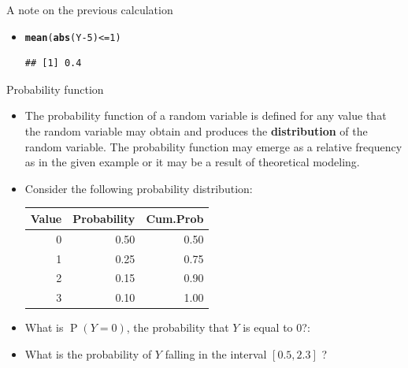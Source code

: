 \documentclass[10pt]{beamer}\usepackage[]{graphicx}\usepackage[]{color}
\makeatletter
\newcommand{\hlnum}[1]{\textcolor[rgb]{0.686,0.059,0.569}{#1}}%
\newcommand{\hlopt}[1]{\textcolor[rgb]{0,0,0}{#1}}%
\newcommand{\hlstd}[1]{\textcolor[rgb]{0.345,0.345,0.345}{#1}}%
\newcommand{\hlkwd}[1]{\textcolor[rgb]{0.737,0.353,0.396}{\textbf{#1}}}%
\newenvironment{kframe}{%
 \def\at@end@of@kframe{}%
 \ifinner\ifhmode%
  \def\at@end@of@kframe{\end{minipage}}%
  \begin{minipage}{\columnwidth}%
 \fi\fi%
 \def\FrameCommand##1{\hskip\@totalleftmargin \hskip-\fboxsep
 \colorbox{shadecolor}{##1}\hskip-\fboxsep
     \hskip-\linewidth \hskip-\@totalleftmargin \hskip\columnwidth}%
 \MakeFramed {\advance\hsize-\width
   \@totalleftmargin\z@ \linewidth\hsize
   \@setminipage}}%
 {\par\unskip\endMakeFramed%
 \at@end@of@kframe}
\newenvironment{knitrout}{}{} %
\newcommand{\Prob}{\operatorname{P}}
\makeatother
\begin{document}
\begin{frame}[fragile]{A note on the previous calculation}
\begin{itemize}[<+->]
\item 		
\begin{knitrout}
\color{fgcolor}\begin{kframe}
\begin{alltt}
\hlkwd{mean}\hlstd{(}\hlkwd{abs}\hlstd{(Y} \hlopt{-} \hlnum{5}\hlstd{)} \hlopt{<=} \hlnum{1}\hlstd{)}
\end{alltt}
\begin{verbatim}
## [1] 0.4
\end{verbatim}
\end{kframe}
\end{knitrout}
		
	\end{itemize}
	
\end{frame}




\begin{frame}[fragile]{Probability function}
	\small
	\begin{itemize}[<+->]
		
		\item The probability function of a random variable is defined for any value
		that the random variable may obtain and produces the \textbf{distribution} of
		the random variable. The probability function may emerge as a relative
		frequency as in the given example or it may be a result of theoretical
		modeling.
		
		\item Consider the following probability distribution:
		
\begin{knitrout}\small
{}\color{fgcolor}
\begin{tabular}{rrr}
\toprule
Value & Probability & Cum.Prob\\
\midrule
0 & 0.50 & 0.50\\
1 & 0.25 & 0.75\\
2 & 0.15 & 0.90\\
3 & 0.10 & 1.00\\
\bottomrule
\end{tabular}

\end{knitrout}
		
		\item What is $\Prob(Y=0)$, the probability that $Y$ is equal to 0?:
		
		\item What is the probability of $Y$ falling in the interval $[0.5, 2.3]$ ?
		
		
	\end{itemize}
	
\end{frame}
\end{document}
